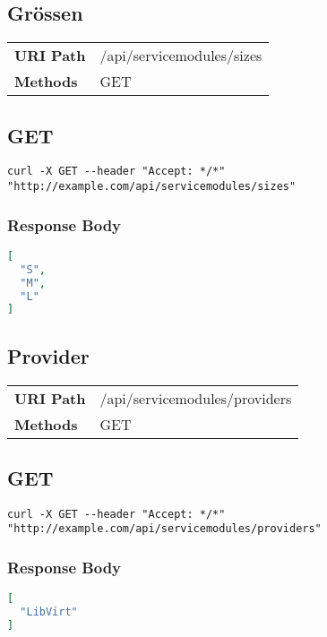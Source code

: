 \subsection{Grössen}
\begin{tabularx}{\linewidth}{l l}
\textbf{URI Path} & /api/servicemodules/sizes\\
\textbf{Methods} & GET\\
\end{tabularx}
\subsection{GET}
\begin{lstlisting}[] 
curl -X GET --header "Accept: */*" "http://example.com/api/servicemodules/sizes"
\end{lstlisting}

\subsubsection{Response Body}
\begin{lstlisting}[language=json] 
[
  "S",
  "M",
  "L"
]
\end{lstlisting}

\subsection{Provider}
\begin{tabularx}{\linewidth}{l l}
\textbf{URI Path} & /api/servicemodules/providers\\
\textbf{Methods} & GET\\
\end{tabularx}
\subsection{GET}
\begin{lstlisting}[] 
curl -X GET --header "Accept: */*" "http://example.com/api/servicemodules/providers"
\end{lstlisting}

\subsubsection{Response Body}
\begin{lstlisting}[language=json] 
[
  "LibVirt"
]
\end{lstlisting}


\newpage





